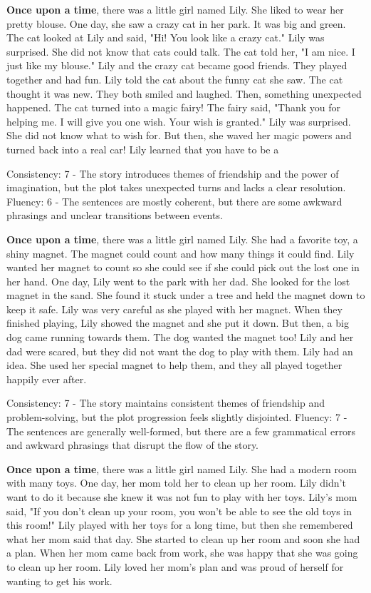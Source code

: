 \documentclass{article}
\begin{document}
\textbf{Once upon a time}, there was a little girl named Lily. She liked to wear her pretty blouse. One day, she saw a crazy cat in her park. It was big and green. The cat looked at Lily and said, "Hi! You look like a crazy cat." Lily was surprised. She did not know that cats could talk. The cat told her, "I am nice. I just like my blouse." Lily and the crazy cat became good friends. They played together and had fun. Lily told the cat about the funny cat she saw. The cat thought it was new. They both smiled and laughed. Then, something unexpected happened. The cat turned into a magic fairy! The fairy said, "Thank you for helping me. I will give you one wish. Your wish is granted." Lily was surprised. She did not know what to wish for. But then, she waved her magic powers and turned back into a real car! Lily learned that you have to be a

Consistency: 7 - The story introduces themes of friendship and the power of imagination, but the plot takes unexpected turns and lacks a clear resolution.
Fluency: 6 - The sentences are mostly coherent, but there are some awkward phrasings and unclear transitions between events.

\textbf{Once upon a time}, there was a little girl named Lily. She had a favorite toy, a shiny magnet. The magnet could count and how many things it could find. Lily wanted her magnet to count so she could see if she could pick out the lost one in her hand. One day, Lily went to the park with her dad. She looked for the lost magnet in the sand. She found it stuck under a tree and held the magnet down to keep it safe. Lily was very careful as she played with her magnet. When they finished playing, Lily showed the magnet and she put it down. But then, a big dog came running towards them. The dog wanted the magnet too! Lily and her dad were scared, but they did not want the dog to play with them. Lily had an idea. She used her special magnet to help them, and they all played together happily ever after.

Consistency: 7 - The story maintains consistent themes of friendship and problem-solving, but the plot progression feels slightly disjointed.
Fluency: 7 - The sentences are generally well-formed, but there are a few grammatical errors and awkward phrasings that disrupt the flow of the story.

\textbf{Once upon a time}, there was a little girl named Lily. She had a modern room with many toys. One day, her mom told her to clean up her room. Lily didn't want to do it because she knew it was not fun to play with her toys. Lily's mom said, "If you don't clean up your room, you won't be able to see the old toys in this room!" Lily played with her toys for a long time, but then she remembered what her mom said that day. She started to clean up her room and soon she had a plan. When her mom came back from work, she was happy that she was going to clean up her room. Lily loved her mom's plan and was proud of herself for wanting to get his work.
\end{document}
